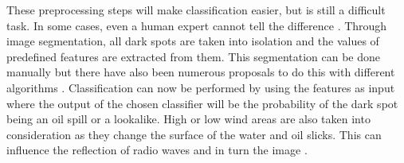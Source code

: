 These preprocessing steps will make classification easier, but is still a difficult task. In some cases, even a human expert cannot tell the difference \cite{Keramitsoglou2006640}. Through image segmentation, all dark spots are taken into isolation and the values of predefined features are extracted from them. This segmentation can be done manually but there have also been numerous proposals to do this with different algorithms \cite{ma2011sar,fjortoft1998optimal, ye2002wavelet}. Classification can now be performed by using the features as input where the output of the chosen classifier will be the probability of the dark spot being an oil spill or a lookalike. 
High or low wind areas are also taken into consideration as they change the surface of the water and oil slicks. This can influence the reflection of radio waves and in turn the image \cite{fingas2014review}.